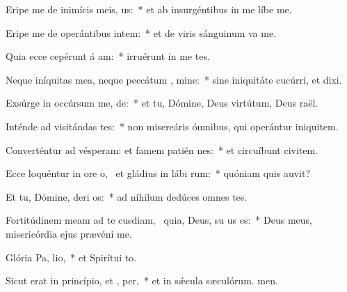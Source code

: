\item Eripe me de inimícis meis,  us:~* et ab insurgéntibus in me líbe me.
\item Eripe me de operántibus intem:~* et de viris sánguinum va me.
\item Quia ecce cepérunt á am:~* irruérunt in me tes.
\item Neque iníquitas mea, neque peccátum , mine:~* sine iniquitáte cucúrri, et dixi.
\item Exsúrge in occúrsum me,  de:~* et tu, Dómine, Deus virtútum, Deus raël.
\item Inténde ad visitándas  tes:~* non misereáris ómnibus, qui operántur iniquitem.
\item Converténtur ad vésperam: et famem patién  nes:~* et circuíbunt civitem.
\item Ecce loquéntur in ore o,~\pscross{} et gládius in lábi rum:~* quóniam quis auvit?
\item Et tu, Dómine, deri os:~* ad níhilum dedúces omnes tes.
\item Fortitúdinem meam ad te cusdiam,~\pscross{} quia, Deus, su us es:~* Deus meus, misericórdia ejus prævéni me.
\item Glória Pa,  lio,~* et Spirítui to.
\item Sicut erat in princípio, et ,  per,~* et in sǽcula sæculórum. men.
